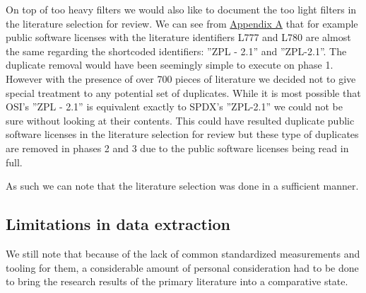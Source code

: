 On top of too heavy filters we would also like to document the too light filters in the literature selection for review. We can see from \hyperref[appendix:a]{Appendix A} that for example public software licenses with the literature identifiers L777 and L780 are almost the same regarding the shortcoded identifiers: ''ZPL - 2.1'' and ''ZPL-2.1''. The duplicate removal would have been seemingly simple to execute on phase 1. However with the presence of over 700 pieces of literature we decided not to give special treatment to any potential set of duplicates. While it is most possible that OSI's ''ZPL - 2.1'' is equivalent exactly to SPDX's ''ZPL-2.1'' we could not be sure without looking at their contents. This could have resulted duplicate public software licenses in the literature selection for review but these type of duplicates are removed in phases 2 and 3 due to the public software licenses being read in full.

As such we can note that the literature selection was done in a sufficient manner.

\subsection{Limitations in data extraction}


We still note that because of the lack of common standardized measurements and tooling for them, a considerable amount of personal consideration had to be done to bring the research results of the primary literature into a comparative state.